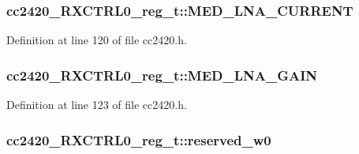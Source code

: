 \subsubsection[{\texorpdfstring{M\+E\+D\+\_\+\+L\+N\+A\+\_\+\+C\+U\+R\+R\+E\+NT}{MED_LNA_CURRENT}}]{ cc2420\+\_\+\+R\+X\+C\+T\+R\+L0\+\_\+reg\+\_\+t\+::\+M\+E\+D\+\_\+\+L\+N\+A\+\_\+\+C\+U\+R\+R\+E\+NT}\hypertarget{structcc2420___r_x_c_t_r_l0__reg__t_af79f78937de2c21cd5206543386a4164}{}\label{structcc2420___r_x_c_t_r_l0__reg__t_af79f78937de2c21cd5206543386a4164}


Definition at line 120 of file cc2420.\+h.

\subsubsection[{\texorpdfstring{M\+E\+D\+\_\+\+L\+N\+A\+\_\+\+G\+A\+IN}{MED_LNA_GAIN}}]{ cc2420\+\_\+\+R\+X\+C\+T\+R\+L0\+\_\+reg\+\_\+t\+::\+M\+E\+D\+\_\+\+L\+N\+A\+\_\+\+G\+A\+IN}\hypertarget{structcc2420___r_x_c_t_r_l0__reg__t_a537f55cd6361050f69c4c3d86086a84b}{}\label{structcc2420___r_x_c_t_r_l0__reg__t_a537f55cd6361050f69c4c3d86086a84b}


Definition at line 123 of file cc2420.\+h.

\subsubsection[{\texorpdfstring{reserved\+\_\+w0}{reserved_w0}}]{ cc2420\+\_\+\+R\+X\+C\+T\+R\+L0\+\_\+reg\+\_\+t\+::reserved\+\_\+w0}\hypertarget{structcc2420___r_x_c_t_r_l0__reg__t_aaabef9114f7c91e663035dbaaba1da45}{}\label{structcc2420___r_x_c_t_r_l0__reg__t_aaabef9114f7c91e663035dbaaba1da45}


